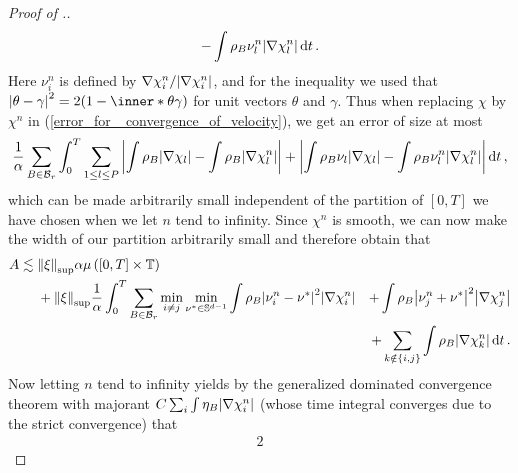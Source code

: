 \begin{proof}[Proof of .]
\begin{align*}
{ 					- 
 					\int
 						\rho_{ B }
 						\nu_{ l }^{ n }
 					\abs{ \nabla \chi_{ l }^{ n } }
 				}
 			\dd{ t }.
	\end{align*}
	Here $ \nu_{ i }^{ n }$ is defined by $ \nabla \chi_{ i }^{ n } / \abs{ 
	\nabla \chi_{ i }^{ n } } $, and for the inequality we used that $ \abs{ 
	\theta - \gamma }^{ 2 } = 2( 1 - \inner*{ \theta }{ \gamma } ) $ for unit 
	vectors $ \theta $ and $ \gamma $. Thus when replacing $ \chi $ by $ \chi^{ 
	n } $ in (\ref{error_for _convergence_of_velocity}), we get an error of size
	at most
	\begin{equation*}
		\frac{ 1 }{ \alpha }
		\sum_{ B \in \mathcal{ B }_{ r } }
			\int_{ 0 }^{ T }
				\sum_{ 1 \leq l \leq P }
					\abs{ 
						\int
							\rho_{ B }
						\abs{ \nabla \chi_{ l } }
						-
						\int
							\rho_{ B }
						\abs{ \nabla \chi_{ l }^{ n } }
					}
					+
					\abs{
						\int
							\rho_{ B }
							\nu_{ l } 
						\abs{ \nabla \chi_{ l } }
						-
						\int
							\rho_{ B }
							\nu_{ l }^{ n }
						\abs{ \nabla \chi_{ l }^{ n } }
					}
			\dd{ t },
	\end{equation*}
	which can be made arbitrarily small independent of the partition of $ [ 0 , 
	T ] $ we have chosen when we let $ n $ tend to infinity.
	Since $ \chi^{ n } $ is smooth, we can now make the width of our partition 
	arbitrarily small and therefore obtain that
	\begin{alignat*}{2}
		A 
		\lesssim{} &
		\norm{ \xi }_{\mathrm{sup}}
		\alpha \mu \left( [ 0 , T ] \times \operatorname{\mathbb{T}} \right)
		\\
		& +
		\norm{ \xi }_{ \mathrm{sup}}
		\frac{ 1 }{ \alpha }
		\int_{ 0 }^{ T }
			\sum_{ B \in \mathcal{ B }_{ r } }
				\min_{ i \neq j }
					\min_{ \nu^{ \ast } \in \mathbb{ S }^{ d - 1 } }
						\int
							\rho_{ B }
							\abs{ \nu_{ i }^{ n } - \nu^{ \ast } }^{ 2 }
						\abs{ \nabla \chi_{ i }^{ n } }
						& +
						\int
							\rho_{ B }
							\abs{ \nu_{ j }^{ n } + \nu^{ \ast } }^{ 2 }
						\abs{ \nabla \chi_{ j }^{ n } }
						\\
						& &
						+
						\sum_{ k \notin \{ i , j \} }
							\int
								\rho_{ B }
							\abs{ \nabla \chi_{ k }^{ n } }
		\dd{ t }.
	\end{alignat*}
	Now letting $ n $ tend to infinity yields by the generalized dominated 
	convergence theorem with majorant 
	$ C \sum_{ i } \int \eta_{ B } \abs{ \nabla \chi_{ i }^{ n } } $ 
	(whose time integral converges due to the strict convergence)
	that
	\begin{alignat*}{2}

\end{alignat*}
\end{proof}
